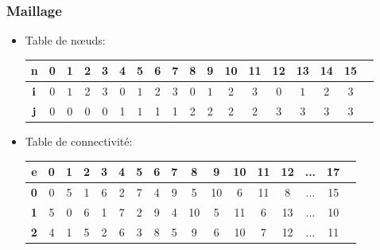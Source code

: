 \documentclass{beamer}
\begin{document}

\begin{frame}
\frametitle{Maillage}
\begin{itemize}
\item  Table de nœuds:
\begin{center}
\begin{tabular}{|c|c|c|c|c|c|c|c|c|c|c|c|c|c|c|c|c|c|}\hline 
{\bf n} & 0 & 1 & 2 & 3 &4 &5 &6 & 7 & 8 &9 &10 & 11  & 12 &13 &14 & 15\\ \hline 
$\mbox{\bf i} $& $0$ & $1$ & 2 & 3 & $0$ & $1$ & 2 & 3& $0$ & $1$ & 2 & 3& $0$ & $1$ & 2 & 3\\ \hline 
$\mbox{\bf j} $& $0$ & $0$ & 0 & 0 & 1 & $1$ & 1 & 1&2&2&2&2  &3&3&3&3\\ \hline 
\end{tabular}
\end{center}
\item Table de connectivité:
\begin{center}
\begin{tabular}{|c|c|c|c|c|c|c|c|c|c|c|c|c|c|c|c|c|}\hline 
{\bf e} & 0 & 1 & 2 & 3 & 4 & 5 & 6 & 7 & 8 &9  &10 & 11  & 12 &... & 17\\ \hline 
{\bf 0}& 0  & 5 & 1 & 6 & 2 & 7 & 4 & 9& 5 &10 & 6 & 11 & 8 & ... &  15\\ \hline 
{\bf 1}& 5 & 0  & 6 & 1 & 7 & 2 & 9 & 4&10&5  &11 &6   &13&... &10\\ \hline 
{\bf 2}& 4 & 1  & 5 & 2 & 6 & 3 & 8 & 5&9 &6  &10  &7   &12&... &11\\ \hline 
\end{tabular}
\end{center}
\end{itemize}




\end{frame}
\end{document}
